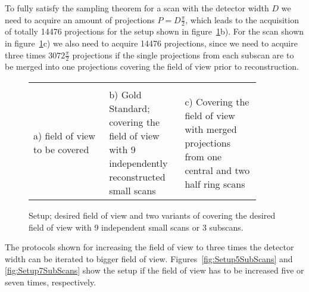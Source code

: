 To fully satisfy the sampling theorem for a scan with the detector width $D$ we need to acquire an amount of projections $P=D\frac{\pi}{2}$, which leads to the acquisition of totally 14476 projections for the setup shown in figure~\ref{fig:Setup3SubScans}b). For the scan shown in figure~\ref{fig:Setup3SubScans}c) we also need to acquire 14476 projections, since we need to acquire three times $3072\frac{\pi}{2}$ projections if the single projections from each subscan are to be merged into one projections covering the field of view prior to reconstruction.

\ifiucr
	\begin{figure}%
		\centering%
		\caption{Setup; desired field of view and two variants of covering the desired field of view with 9 independent small scans or 3 subscans.}%
		\begin{tabular}{p{0.3\linewidth}p{0.3\linewidth}p{0.3\linewidth}}%
			&%
			&%
			\\%
			a) field of view to be covered&%
			b) Gold Standard; covering the field of view with 9 independently reconstructed small scans&%
			c) Covering the field of view with merged projections from one central and two half ring scans\\%
		\end{tabular}%
		\label{fig:Setup3SubScans}%
	\end{figure}%
\else
	\begin{figure*}[htp]
		\centering%
		\caption{Setup; desired field of view and two variants of covering the desired field of view with 9 independent small scans or 3 subscans.}%
		\label{fig:Setup3SubScans}%
	\end{figure*}
\fi

The protocols shown for increasing the field of view to three times the detector width can be iterated to bigger field of view. Figures~\ref{fig:Setup5SubScans} and \ref{fig:Setup7SubScans} show the setup if the field of view has to be increased five or seven times, respectively.

